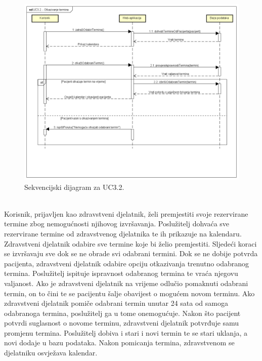 \begin{figure}[H]
	\includegraphics[scale=0.5]{slike/UC3.2_Otkazivanje_termina}
	\centering
	\caption{Sekvencijski dijagram za UC3.2.}
\end{figure}

\newpage

\textbf{}\\

Korisnik, prijavljen kao zdravstveni djelatnik, želi premjestiti svoje rezervirane termine zbog nemogućnosti njihovog izvršavanja. Poslužitelj dohvaća sve rezervirane termine od zdravstvenog djelatnika te ih prikazuje na kalendaru. Zdravstveni djelatnik odabire sve termine koje bi želio premjestiti. Sljedeći koraci se izvršavaju sve dok se ne obrade svi odabrani termini. Dok se ne dobije potvrda pacijenta, zdravstveni djelatnik odabire opciju otkazivanja trenutno odabranog termina. Poslužitelj ispituje ispravnost odabranog termina te vraća njegovu valjanost. Ako je zdravstveni djelatnik na vrijeme odlučio pomaknuti odabrani termin, on to čini te se pacijentu šalje obavijest o mogućem novom terminu. Ako zdravstveni djelatnik pomiče odabrani termin unutar 24 sata od samoga odabranoga termina, poslužitelj ga u tome onemogućuje. Nakon što pacijent potvrdi suglasnost o novome terminu, zdravstveni djelatnik potvrđuje samu promjenu termina. Poslužitelj dobiva i stari i novi termin te se stari uklanja, a novi dodaje u bazu podataka. Nakon pomicanja termina, zdravstvenom se djelatniku osvježava kalendar.

